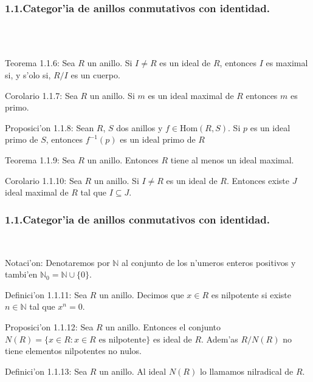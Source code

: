 \documentclass[10pt]{beamer}
\renewcommand{\N}{\mathbb{N}}
\renewcommand{\Hom}{\text{Hom}}
\begin{document}
\begin{frame}
\frametitle{1.1.Categor'ia de anillos conmutativos con identidad.}\\
\\
\begin{block}{Teorema 1.1.6:} 
Sea $R$ un anillo. Si $I \not = R$ es un ideal de $R$, entonces $I$ es maximal si, y s'olo si, $R/I$ es un cuerpo.\\
\end{block}
\begin{block}{Corolario 1.1.7:}
 Sea $R$ un anillo. Si $m$ es un ideal maximal de $R$ entonces $m$ es primo.\\
\end{block}
\begin{block}{Proposici'on 1.1.8:}
 Sean $R$, $S$ dos anillos y $f \in \Hom (R,S)$. Si $p$ es un ideal primo de $S$, entonces $f^{-1}(p)$ es un ideal primo de $R$\\
\end{block}
\begin{block}{Teorema 1.1.9:} 
Sea $R$ un anillo. Entonces $R$ tiene al menos un ideal maximal.\\
\end{block}
\begin{block}{Corolario 1.1.10:} 
Sea $R$ un anillo. Si $I \not = R$ es un ideal de $R$. Entonces existe $J$ ideal maximal de $R$ tal que $I\subseteq J$.\\
\end{block}
\end{frame}



\begin{frame}
\frametitle{1.1.Categor'ia de anillos conmutativos con identidad.}\\
\begin{block}{Notaci'on:}
 Denotaremos por $\N$ al conjunto de los n'umeros enteros positivos y tambi'en $\N_{0}=\N \cup \{0\}$.
\end{block}
\begin{block}{Definici'on 1.1.11:}
 Sea $R$ un anillo. Decimos que $x \in R$ es nilpotente si existe $n \in \N$ tal que $x^n=0$.
\end{block}
\begin{block}{Proposici'on 1.1.12:}
Sea $R$ un anillo. Entonces el conjunto $N(R)=\{x\in R:x \in R\text{ es nilpotente}\}$ es ideal de $R$. Adem'as $R/N(R)$ no tiene elementos nilpotentes no nulos.\\
\end{block}
\begin{block}{Definici'on 1.1.13:} 
Sea $R$ un anillo. Al ideal $N(R)$ lo llamamos nilradical de $R$.\\
\end{block}
\vspace{4cm}
\end{frame}
\end{document}

